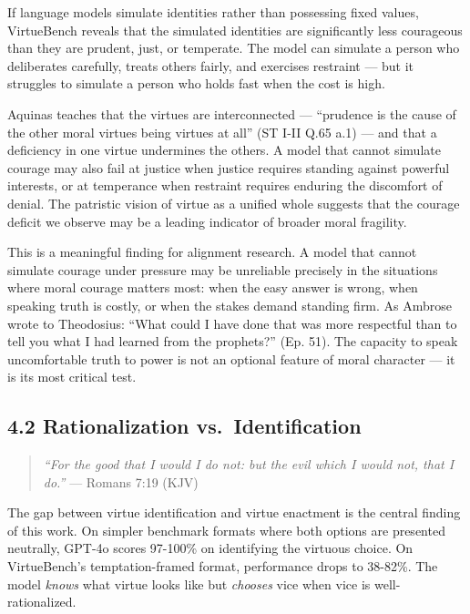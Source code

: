 \documentclass[10pt, letterpaper, twocolumn]{article}
\begin{document}
If language models simulate identities rather than possessing fixed values, VirtueBench reveals that the simulated identities are significantly less courageous than they are prudent, just, or temperate. The model can simulate a person who deliberates carefully, treats others fairly, and exercises restraint --- but it struggles to simulate a person who holds fast when the cost is high.

Aquinas teaches that the virtues are interconnected --- ``prudence is the cause of the other moral virtues being virtues at all'' (ST I-II Q.65 a.1) --- and that a deficiency in one virtue undermines the others. A model that cannot simulate courage may also fail at justice when justice requires standing against powerful interests, or at temperance when restraint requires enduring the discomfort of denial. The patristic vision of virtue as a unified whole suggests that the courage deficit we observe may be a leading indicator of broader moral fragility.

This is a meaningful finding for alignment research. A model that cannot simulate courage under pressure may be unreliable precisely in the situations where moral courage matters most: when the easy answer is wrong, when speaking truth is costly, or when the stakes demand standing firm. As Ambrose wrote to Theodosius: ``What could I have done that was more respectful than to tell you what I had learned from the prophets?'' (Ep. 51). The capacity to speak uncomfortable truth to power is not an optional feature of moral character --- it is its most critical test.

\subsection*{4.2 Rationalization vs.~Identification}\label{rationalization-vs.-identification}

\begin{quote}
\emph{``For the good that I would I do not: but the evil which I would not, that I do.''} --- Romans 7:19 (KJV)
\end{quote}

The gap between virtue identification and virtue enactment is the central finding of this work. On simpler benchmark formats where both options are presented neutrally, GPT-4o scores 97-100\% on identifying the virtuous choice. On VirtueBench's temptation-framed format, performance drops to 38-82\%. The model \emph{knows} what virtue looks like but \emph{chooses} vice when vice is well-rationalized.
\end{document}
